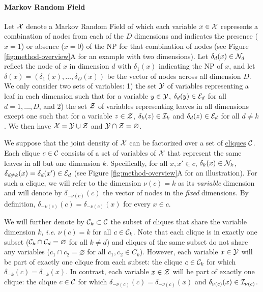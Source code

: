 \documentclass[
11pt, %
oneside, %
english, %
singlespacing, %
headsepline, %
chapterinoneline, %
]{MastersDoctoralThesis} %
\def\E{\mathbb{E}}
\def\C{{\cal C}}
\def\E{{\cal E}}
\def\I{{\cal I}}
\def\N{{\cal N}}
\def\X{{\cal X}}
\def\Y{{\cal Y}}
\def\Z{{\cal Z}}
\begin{document}
\paragraph{Markov Random Field} Let $\X$ denote a Markov Random Field of which each variable $x \in \X$ represents a combination of nodes from each of the $D$ dimensions and indicates the presence ($x=1$) or absence ($x=0$) of the NP for that combination of nodes (see Figure \ref{fig:method-overview}A for an example with two dimensions). Let $\delta_d(x) \in \N_d$ reflect the node of $x$ in dimension $d$ with $\delta_1(x)$ indicating the NP of $x$, and let $\delta(x)=(\delta_1(x), \ldots, \delta_D(x))$ be the vector of nodes across all dimension $D$. We only consider two sets of variables: 1) the set $\Y$ of variables representing a leaf in each dimension such that for a variable $y\in\Y$, $\delta_d(y) \in \E_d$ for all $d=1, \ldots, D$, and 2) the set $\Z$ of variables representing leaves in all dimensions except one such that for a variable $z \in \Z$, $\delta_k(z) \in \I_k$ and $\delta_d(z) \in \E_d$ for all $d \neq k$. We then have $\X = \Y \cup \Z$ and $\Y \cap \Z = \varnothing$.


We suppose that the joint density of $\X$ can be factorized over a set of \href{https://en.wikipedia.org/wiki/Clique_(graph_theory)}{cliques} $\C$. Each clique $c \in \C$ consists of a set of variables of $\X$ that represent the same leaves in all but one dimension $k$. Specifically, for all $x,x' \in c$, $\delta_k(x) \in \N_k$, $\delta_{d \neq k}(x) = \delta_d(x') \in \E_d$ (see Figure \ref{fig:method-overview}A for an illustration). For such a clique, we will refer to the dimension $\nu(c) = k$ as its \emph{variable} dimension and will denote by $\delta_{-\nu(c)}(c)$ the vector of nodes in the \emph{fixed} dimensions. By definition, $\delta_{-\nu(c)}(c)=\delta_{-\nu(c)}(x)$ for every $x \in c$.

We will further denote by $\C_k \subset \C$ the subset of cliques that share the variable dimension $k$, \textit{i.e.} $\nu(c)=k$ for all $c \in \C_k$. Note that each clique is in exactly one subset ($\C_k \cap \C_d = \varnothing$ for all $k \neq d$) and cliques of the same subset do not share any variables ($c_1 \cap c_2 = \varnothing$ for all $c_1, c_2 \in C_k$). However, each variable $x \in \Y$ will be part of exactly one clique from each subset: the clique $c \in \C_k$ for which $\delta_{-k}(c) = \delta_{-k}(x)$. In contrast, each variable $x \in \Z$ will be part of exactly one clique: the clique $c \in \C$ for which $\delta_{-\nu(c)}(c) = \delta_{-\nu(c)}(x)$ and $\delta_{\nu(c)}(x) \in \I_{\nu(c)}$.
\end{document}
